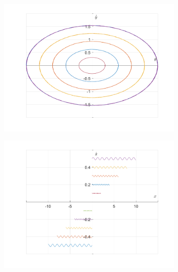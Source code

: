 \documentclass{article}
\begin{document}
	\begin{figure}[h!]
		\centering
		\begin{subfigure}[b]{0.48\linewidth}
			\includegraphics[width=\linewidth]{./SmallOscillations/S8/F5.png}
		\end{subfigure}
		\begin{subfigure}[b]{0.48\linewidth}
			\includegraphics[width=\linewidth]{./SmallOscillations/S8/F6.png}
		\end{subfigure}
	\end{figure}
	\newpage
	
\end{document}
